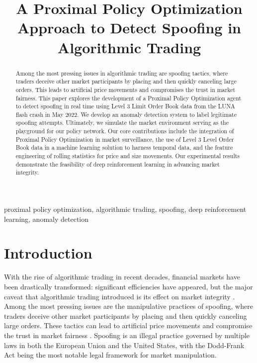\documentclass[conference]{IEEEtran}
\begin{document}
\title{A Proximal Policy Optimization Approach to Detect Spoofing in Algorithmic Trading}

\author{
}

\maketitle

\begin{abstract}
Among the most pressing issues in algorithmic trading are spoofing tactics, where traders deceive other market participants by placing and then quickly canceling large orders. This leads to artificial price movements and compromises the trust in market fairness. This paper explores the development of a Proximal Policy Optimization agent to detect spoofing in real time using Level 3 Limit Order Book data from the LUNA flash crash in May 2022. We develop an anomaly detection system to label legitimate spoofing attempts. Ultimately, we simulate the market environment serving as the playground for our policy network. Our core contributions include the integration of Proximal Policy Optimization in market surveillance, the use of Level 3 Level Order Book data in a machine learning solution to harness temporal data, and the feature engineering of rolling statistics for price and size movements. Our experimental results demonstrate the feasibility of deep reinforcement learning in advancing market integrity.
\end{abstract}

\begin{IEEEkeywords}
proximal policy optimization, algorithmic trading, spoofing, deep reinforcement learning, anomaly detection
\end{IEEEkeywords}

\section{Introduction}
With the rise of algorithmic trading in recent decades, financial markets have been drastically transformed: significant efficiencies have appeared, but the major caveat that algorithmic trading introduced is its effect on market integrity \cite{Hendershott_Riordan_2013}. Among the most pressing issues are the manipulative practices of spoofing, where traders deceive other market participants by placing and then quickly canceling large orders. These tactics can lead to artificial price movements and compromise the trust in market fairness \cite{Armour_PFR}. Spoofing is an illegal practice governed by multiple laws in both the European Union and the United States, with the Dodd-Frank Act \cite{Dodd_Frank} being the most notable legal framework for market manipulation.
\end{document}
